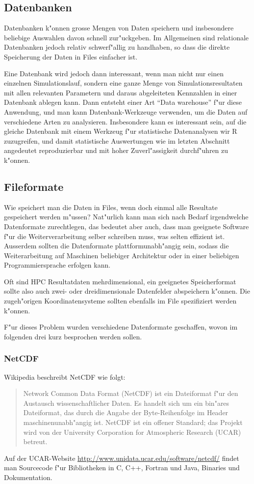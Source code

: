 \subsection{Datenbanken}
Datenbanken k"onnen grosse Mengen von Daten speichern und insbesondere
beliebige Auswahlen davon schnell zur"uckgeben.
Im Allgemeinen sind relationale Datenbanken jedoch relativ 
schwerf"allig zu handhaben, so dass die direkte Speicherung
der Daten in Files einfacher ist.

Eine Datenbank wird jedoch dann interessant, wenn man nicht nur einen
einzelnen Simulationslauf, sondern eine ganze Menge von Simulationsresultaten
mit allen relevanten Parametern und daraus abgeleiteten Kennzahlen
in einer Datenbank ablegen kann.
Dann entsteht einer Art ``Data warehouse'' f"ur diese Anwendung,
und man kann Datenbank-Werkzeuge verwenden, um die Daten auf
verschiedene Arten zu analysieren. 
Insbesondere kann es interessant sein, auf die gleiche Datenbank
mit einem Werkzeug f"ur statistische Datenanalysen wir R zuzugreifen,
und damit statistische Auswertungen wie im letzten Abschnitt
angedeutet reproduzierbar und mit hoher Zuverl"assigkeit durchf"uhren
zu k"onnen.

\subsection{Fileformate}
Wie speichert man die Daten in Files, wenn doch einmal alle Resultate
gespeichert werden m"ussen?
Nat"urlich kann man sich nach Bedarf irgendwelche Datenformate zurechtlegen,
das bedeutet aber auch, dass man geeignete Software f"ur die
Weiterverarbeitung selber schreiben muss, was selten effizient ist.
Ausserdem sollten die Datenformate plattformunabh"angig sein,
sodass die Weiterarbeitung auf Maschinen beliebiger Architektur
oder in einer beliebigen Programmiersprache erfolgen kann.

Oft sind HPC Resultatdaten mehrdimensional, ein geeignetes Speicherformat
sollte also auch zwei- oder dreidimensionale Datenfelder abspeichern
k"onnen.
Die zugeh"origen Koordinatensysteme sollten ebenfalls im File
spezifiziert werden k"onnen.

F"ur dieses Problem wurden verschiedene Datenformate geschaffen, 
wovon im folgenden drei kurz besprochen werden sollen.

\subsubsection{NetCDF}
Wikipedia beschreibt NetCDF wie folgt:
\begin{quote}
Network Common Data Format (NetCDF) ist ein Dateiformat f"ur den
Austausch wissenschaftlicher Daten. Es handelt sich um ein bin"ares
Dateiformat, das durch die Angabe der Byte-Reihenfolge im Header
maschinenunabh"angig ist. NetCDF ist ein offener Standard; das Projekt
wird von der University Corporation for Atmospheric Research (UCAR)
betreut.
\end{quote}
Auf der UCAR-Website \url{http://www.unidata.ucar.edu/software/netcdf/}
findet man Sourcecode f"ur Bibliotheken in C, C++, Fortran und Java,
Binaries und Dokumentation. 

